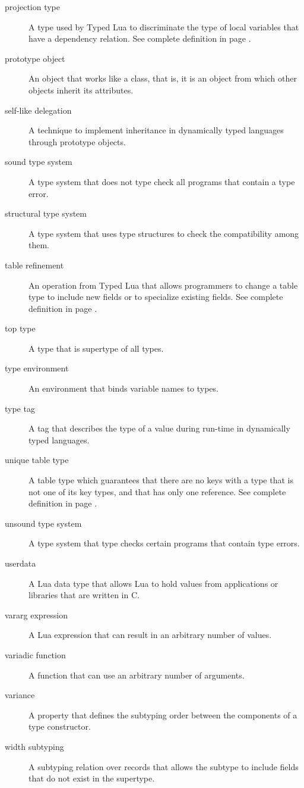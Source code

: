 \begin{description}
\item[projection type] A type used by Typed Lua to discriminate the type of local
variables that have a dependency relation.
See complete definition in page \pageref{def:projectiontype}.

\item[prototype object] An object that works like a class, that is, it is an object from
which other objects inherit its attributes.

\item[self-like delegation] A technique to implement inheritance in dynamically typed
languages through prototype objects.

\item[sound type system] A type system that does not type check all programs that contain a type error.

\item[structural type system] A type system that uses type structures to check the compatibility among them.

\item[table refinement] An operation from Typed Lua that allows programmers to change a table type
to include new fields or to specialize existing fields.
See complete definition in page \pageref{sec:refinement}.

\item[top type] A type that is supertype of all types.

\item[type environment] An environment that binds variable names to types.

\item[type tag] A tag that describes the type of a value during run-time in dynamically
typed languages.

\item[unique table type] A table type which guarantees that there are no
keys with a type that is not one of its key types, and that has only one reference.
See complete definition in page \pageref{def:tabletype}.

\item[unsound type system] A type system that type checks certain programs that contain type errors.

\item[userdata] A Lua data type that allows Lua to hold values from applications
or libraries that are written in C.

\item[vararg expression] A Lua expression that can result in an arbitrary number of values.

\item[variadic function] A function that can use an arbitrary number of arguments.

\item[variance] A property that defines the subtyping order between the components
of a type constructor.

\item[width subtyping] A subtyping relation over records that allows the subtype to
include fields that do not exist in the supertype.

\end{description}
